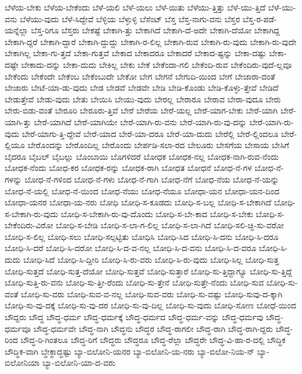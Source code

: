 {ಬೆಳೆಯ-ಬೇಕು
ಬೆಳೆಯ-ಬೇಕೆಂದು
ಬೆಳೆ-ಯಲಿ
ಬೆಳೆ-ಯಲು
ಬೆಳೆ-ಯಿತು
ಬೆಳೆಯು-ತ್ತಿತ್ತು
ಬೆಳೆ-ಯು-ತ್ತಿದೆ
ಬೆಳೆ-ಯು-ವನು
ಬೆಳೆಯು-ವುದು
ಬೆಳೆ-ಸಿದ್ದೇವೆ
ಬೆಳ್ಳಿಯ
ಬೆಳ್ಳುಳ್ಳಿ
ಬೆಸೆಂಟ್
ಬೆಸ್ತ
ಬೆಸ್ತ-ನಾಗು-ವನು
ಬೆಸ್ತರ
ಬೆಸ್ತ-ರ-ಪಡೆ-ಯನ್ನೆಲ್ಲಾ
ಬೆಸ್ತ-ರಿಗೂ
ಬೆಸ್ತರು
ಬೇಕಷ್ಟೆ
ಬೇಕಾಗಿ-ತ್ತು
ಬೇಕಾಗಿದೆ
ಬೇಕಾಗಿ-ದೆ-ಅದೇ
ಬೇಕಾಗಿ-ದೆಯೋ
ಬೇಕಾಗಿದ್ದ
ಬೇಕಾಗಿ-ದ್ದರೆ
ಬೇಕಾಗಿ-ದ್ದಾರೆ
ಬೇಕಾಗಿ-ದ್ದುದ್ದು
ಬೇಕಾಗಿ-ರ-ಲಿಲ್ಲ
ಬೇಕಾಗಿ-ರುವ
ಬೇಕಾಗಿ-ರು-ವುದು
ಬೇಕಾಗಿ-ರು-ವುದೇ
ಬೇಕಾಗಿಲ್ಲ
ಬೇಕಾ-ಗು-ತ್ತದೆ
ಬೇಕಾ-ಗುತ್ತವೆ
ಬೇಕಾದ
ಬೇಕಾದರೂ
ಬೇಕಾದರೆ
ಬೇಕಾದ-ಷ್ಟನ್ನು
ಬೇಕಾ-ದಷ್ಟು
ಬೇಕಾ-ದಷ್ಟೇ
ಬೇಕಾದು-ದನ್ನು
ಬೇಕಾ-ದುದು
ಬೇಕಿಲ್ಲ
ಬೇಕು
ಬೇಕೆ
ಬೇಕೆಂದಾ-ಗಲಿ
ಬೇಕೆಂದಿ-ರುವ
ಬೇಕೆಂದಿರು-ವುದೆ-ಲ್ಲವೂ
ಬೇಕೆಂದು
ಬೇಕೆಂದೇ
ಬೇಕೆಂಬ
ಬೇಕೆಂಬುದೇ
ಬೇಕೋ
ಬೇಗ
ಬೇಗನೆ
ಬೇಗುದಿ-ಯಿಂದ
ಬೇಗೆ
ಬೇಜಾರಾ-ದಂತೆ
ಬೇಜಾರು
ಬೇಟೆ-ಯಾ-ಡು-ವುದು
ಬೇಡ
ಬೇಡವೆ
ಬೇಡವೇ
ಬೇಡಿ
ಬೇಡಿ-ಕೊಂಡು
ಬೇಡಿ-ಕೊಳ್ಳು-ತ್ತೇವೆ
ಬೇಡಿದೆ
ಬೇಡುತ್ತೇವೆ
ಬೇಡು-ವುದು
ಬೇತು
ಬೇಯಿಸಿ
ಬೇಯು-ವುದು
ಬೇರಲ್ಲ
ಬೇರಾರೂ
ಬೇರಾವ
ಬೇರಾ-ವುದೂ
ಬೇರು
ಬೇರು-ಬಿಡು-ವಂತೆ
ಬೇರೂರಿ
ಬೇರೂರು-ತ್ತಿವೆ
ಬೇರೆ
ಬೇರೆಯ
ಬೇರೆ-ಯಲ್ಲ
ಬೇರೆ-ಯಾಗ-ಬೇಕು
ಬೇರೆ-ಯಾಗಿ
ಬೇರೆ-ಯಾಗಿ-ತ್ತು
ಬೇರೆ-ಯಾಗಿದೆ
ಬೇರೆ-ಯಾಗಿಯೇ
ಬೇರೆ-ಯಾಗಿ-ರು-ವನು
ಬೇರೆ-ಯಾಗಿ-ರು-ವು-ದನ್ನು
ಬೇರೆ-ಯಾಗಿ-ರು-ವುದು
ಬೇರೆ-ಯಾಗು-ತ್ತಿ-ದ್ದೇವೆ
ಬೇರೆ-ಯಾದ
ಬೇರೆ-ಯಾ-ದರೂ
ಬೇರೆ-ಯಾ-ದುದು
ಬೇರೆಲ್ಲಿ
ಬೇರೆ-ಲ್ಲಿಂದಲೂ
ಬೇರೆ-ಲ್ಲಿಯೂ
ಬೇರೊಂದನ್ನು
ಬೇರೊಂದಿಲ್ಲ
ಬೇರೊಂದು
ಬೇರ್ಪಡಿ-ಸಲಾ-ರದ
ಬೇಲೂರು
ಬೇಸಗೆಯ
ಬೇಸಾಯ
ಬೇಸಿಗೆ
ಬೈದರೂ
ಬೈಬಲ್
ಬೈಬಲ್ಲು
ಬೊಂಬಾಯಿ
ಬೊಗಳಿದರೆ
ಬೋಧಕ
ಬೋಧಕ-ನಲ್ಲ
ಬೋಧಕ-ನಾಗಿ-ರುವ-ನೆಂದು
ಬೋಧಕ-ನೆಂದು
ಬೋಧ-ಕರ
ಬೋಧಕ-ರನ್ನು
ಬೋಧಕ-ರಾಗಿ
ಬೋಧತ
ಬೋಧನೆ
ಬೋಧ-ನೆ-ಗಳ
ಬೋಧ-ನೆ-ಗಳನ್ನು
ಬೋಧ-ನೆ-ಗಳಿಂದ
ಬೋಧ-ನೆ-ಗಳು
ಬೋಧ-ನೆ-ಗಾಗಿ
ಬೋಧ-ನೆಗೆ
ಬೋಧ-ನೆಯ
ಬೋಧ-ನೆ-ಯನ್ನು
ಬೋಧ-ನೆ-ಯಲ್ಲಿ
ಬೋಧ-ನೆ-ಯಿಂದ
ಬೋಧ-ನೆಯು
ಬೋಧ-ನೆಯೂ
ಬೋಧಾ-ಯನ
ಬೋಧಾ-ಯನ-ದಿಂದ
ಬೋಧಾ-ಯನರ
ಬೋಧಾ-ಯ-ನರು
ಬೋಧಿ
ಬೋಧಿ-ಸ-ಕೂಡದು
ಬೋಧಿ-ಸ-ಬಲ್ಲ
ಬೋಧಿ-ಸ-ಬೇಕಾಗಿದೆ
ಬೋಧಿ-ಸ-ಬೇಕಾಗಿ-ರು-ವುದು
ಬೋಧಿ-ಸ-ಬೇಕಾಗಿ-ರು-ವು-ದೊಂದು
ಬೋಧಿ-ಸ-ಬೇ-ಕಾದ
ಬೋಧಿ-ಸ-ಬೇಕು
ಬೋಧಿ-ಸ-ಬೇಕೆಂದಿರು-ವಿರೋ
ಬೋಧಿ-ಸ-ಬೇಡಿ
ಬೋಧಿ-ಸ-ಲಾ-ಗ-ಲಿಲ್ಲ
ಬೋಧಿ-ಸ-ಲಾ-ಗಿದೆ
ಬೋಧಿ-ಸಲಿ-ಚ್ಛಿ-ಸು-ವರೋ
ಬೋಧಿ-ಸ-ಲಿಲ್ಲ
ಬೋಧಿ-ಸಲು
ಬೋಧಿ-ಸಲ್ಪಟ್ಟಿತು
ಬೋಧಿಸಿ
ಬೋಧಿ-ಸಿದ
ಬೋಧಿ-ಸಿ-ದನು
ಬೋಧಿ-ಸಿ-ದರೂ
ಬೋಧಿ-ಸಿ-ದರೆ
ಬೋಧಿ-ಸಿ-ದರೋ
ಬೋಧಿ-ಸಿ-ದ-ವ-ನಲ್ಲ
ಬೋಧಿ-ಸಿ-ದ-ವನು
ಬೋಧಿ-ಸಿ-ದ-ವರೂ
ಬೋಧಿ-ಸಿ-ದುದು
ಬೋಧಿ-ಸಿದೆ
ಬೋಧಿ-ಸಿ-ದ್ದೀರಿ
ಬೋಧಿ-ಸಿ-ರು-ವರು
ಬೋಧಿ-ಸಿ-ರು-ವುದು
ಬೋಧಿ-ಸಿಲ್ಲ
ಬೋಧಿ-ಸುತ್ತ
ಬೋಧಿ-ಸುತ್ತದೆ
ಬೋಧಿ-ಸುತ್ತ-ದೆಯೋ
ಬೋಧಿ-ಸುತ್ತವೆ
ಬೋಧಿ-ಸುತ್ತಾರೆ
ಬೋಧಿ-ಸು-ತ್ತಿದ್ದಾಗ್ಯೂ
ಬೋಧಿ-ಸು-ತ್ತಿದ್ದೆ
ಬೋಧಿ-ಸುತ್ತಿ-ರು-ವನು
ಬೋಧಿ-ಸು-ತ್ತೀ-ರೆಂದು
ಬೋಧಿ-ಸು-ತ್ತೇನೆ
ಬೋಧಿ-ಸುತ್ತೇ-ನೆಂದು
ಬೋಧಿ-ಸುವ
ಬೋಧಿ-ಸು-ವಂತೆ
ಬೋಧಿ-ಸು-ವರು
ಬೋಧಿ-ಸುವ-ವ-ನಲ್ಲ
ಬೋಧಿ-ಸುವ-ವರು
ಬೋಧಿ-ಸು-ವಷ್ಟು
ಬೋಧಿ-ಸುವು-ದ-ಕ್ಕಾಗಿ
ಬೋಧಿ-ಸು-ವು-ದಕ್ಕೆ
ಬೋಧಿ-ಸು-ವು-ದರ
ಬೋಧಿ-ಸು-ವು-ದಿಲ್ಲ
ಬೋಧಿ-ಸು-ವುದು
ಬೋಧಿ-ಸೋಣ
ಬೋಧೆ-ಯಿಂದ
ಬೌದ್ದರು
ಬೌದ್ಧ
ಬೌದ್ಧ-ಧರ್ಮ
ಬೌದ್ಧ-ಧರ್ಮಕ್ಕೆ
ಬೌದ್ಧ-ಧರ್ಮದ
ಬೌದ್ಧ-ಧರ್ಮ-ವನ್ನು
ಬೌದ್ಧ-ಧರ್ಮವು
ಬೌದ್ಧ-ಧರ್ಮವೂ
ಬೌದ್ಧ-ಧರ್ಮವೇ
ಬೌದ್ಧ-ನಾಗಿ
ಬೌದ್ಧನು
ಬೌದ್ಧರ
ಬೌದ್ಧ-ರಾಗಲೀ
ಬೌದ್ಧ-ರಾಗಿ
ಬೌದ್ಧ-ರಾಗಿ-ದ್ದರು
ಬೌದ್ಧ-ರಿಂದ
ಬೌದ್ಧ-ರಿ-ಗಿಂತಲೂ
ಬೌದ್ಧ-ರಿಗೆ
ಬೌದ್ಧರು
ಬೌದ್ಧರೂ
ಬೌದ್ಧ-ರೆಲ್ಲಾ
ಬೌದ್ಧರೇ
ಬೌದ್ಧ-ವಿ-ಹಾ-ರ-ದಲ್ಲಿ
ಬೌದ್ಧಿಕ
ಬೌದ್ಧಿಕ-ವಾಗಿ
ಬ್ಧೇಕ್ಧಾದ್ಧಷ್ಟು
ಬ್ಯಾ-ಬಿಲೋನಿ-ಯನರ
ಬ್ಯಾ-ಬಿಲೋನಿ-ಯ-ನರು
ಬ್ಯಾ-ಬಿಲೋ-ನಿಯ-ನ್
ಬ್ಯಾ-ಬಿಲೋನಿಯಾ
ಬ್ಯಾ-ಬಿಲೋನಿ-ಯಾ-ದ-ವರು
}
